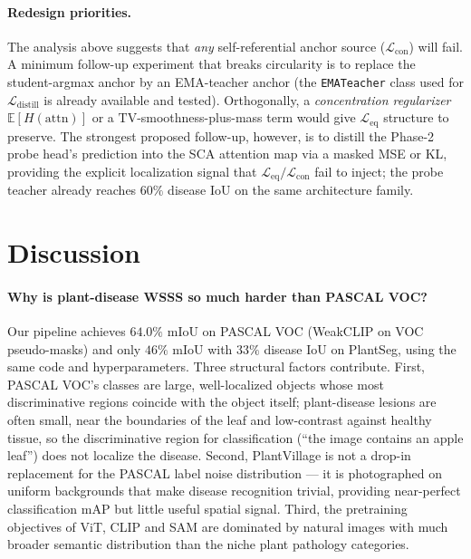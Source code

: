 \documentclass[11pt,a4paper]{article}
\newcommand{\Leq}{\mathcal{L}_{\mathrm{eq}}}
\newcommand{\Lcon}{\mathcal{L}_{\mathrm{con}}}
\newcommand{\Ldist}{\mathcal{L}_{\mathrm{distill}}}
\newcommand{\mIoU}{\mathrm{mIoU}}
\begin{document}
\paragraph{Redesign priorities.}
The analysis above suggests that \emph{any} self-referential anchor
source ($\Lcon$) will fail. A minimum follow-up experiment that breaks
circularity is to replace the student-argmax anchor by an EMA-teacher
anchor (the \texttt{EMATeacher} class used for $\Ldist$ is already
available and tested). Orthogonally, a \emph{concentration regularizer}
$\mathbb{E}[H(\mathrm{attn})]$ or a $\mathrm{TV}$-smoothness-plus-mass
term would give $\Leq$ structure to preserve. The strongest proposed
follow-up, however, is to distill the Phase-2 probe head's prediction
into the SCA attention map via a masked MSE or KL, providing the
explicit localization signal that $\Leq/\Lcon$ fail to inject; the
probe teacher already reaches $60\%$ disease IoU on the same
architecture family.

\section{Discussion}
\label{sec:discussion}

\paragraph{Why is plant-disease WSSS so much harder than PASCAL VOC?}
Our pipeline achieves $64.0\%$ $\mIoU$ on PASCAL VOC (WeakCLIP on
VOC pseudo-masks) and only $46\%$ $\mIoU$ with $33\%$ disease IoU on
PlantSeg, using the same code and hyperparameters. Three structural
factors contribute. First, PASCAL VOC's classes are large,
well-localized objects whose most discriminative regions coincide with
the object itself; plant-disease lesions are often small, near the
boundaries of the leaf and low-contrast against healthy tissue, so the
discriminative region for classification
(``the image contains an apple leaf'') does not localize the disease.
Second, PlantVillage is not a drop-in replacement for the PASCAL label
noise distribution — it is photographed on uniform backgrounds that
make disease recognition trivial, providing near-perfect
classification mAP but little useful spatial signal. Third, the
pretraining objectives of ViT, CLIP and SAM are dominated by natural
images with much broader semantic distribution than the
niche plant pathology categories.
\end{document}

